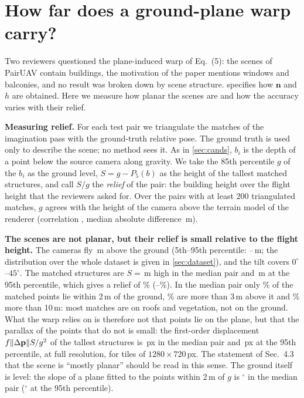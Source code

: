 \section{How far does a ground-plane warp carry?}
\label{sec:planarity}

Two reviewers questioned the plane-induced warp of Eq.~(5): the scenes of PairUAV contain buildings, the motivation of the paper mentions windows and balconies, and no result was broken down by scene structure.  specifies how $\mathbf{n}$ and $h$ are obtained. Here we measure how planar the scenes are and how the accuracy varies with their relief.

\noindent\textbf{Measuring relief.} For each test pair we triangulate the matches of the imagination pass with the ground-truth relative pose. The ground truth is used only to describe the scene; no method sees it. As in \cref{sec:cands}, $b_i$ is the depth of a point below the source camera along gravity. We take the 85th percentile $g$ of the $b_i$ as the ground level, $S=g-P_5(b)$ as the height of the tallest matched structures, and call $S/g$ the \emph{relief} of the pair: the building height over the flight height that the reviewers asked for. Over the \plN{} pairs with at least 200 triangulated matches, $g$ agrees with the height of the camera above the terrain model of the renderer (correlation \plTerrCorr, median absolute difference \plTerrDiff\,m).

\noindent\textbf{The scenes are not planar, but their relief is small relative to the flight height.} The cameras fly \plGroundMed\,m above the ground (5th--95th percentile: \plGroundLo--\plGroundHi\,m; the distribution over the whole dataset is given in \cref{sec:dataset}), and the tilt covers $0^\circ$--$45^\circ$. The matched structures are $S{=}$\plStructMed\,m high in the median pair and \plStructHi\,m at the 95th percentile, which gives a relief of \plReliefMed\% (\plReliefLo--\plReliefHi\%). In the median pair only \plNearMed\% of the matched points lie within 2\,m of the ground, \plOffThreeMed\% are more than 3\,m above it and \plOffTenMed\% more than 10\,m: most matches are on roofs and vegetation, not on the ground. What the warp relies on is therefore not that points lie on the plane, but that the parallax of the points that do not is small: the first-order displacement $f\|\Delta\mathbf{p}\|S/g^2$ of the tallest structures is \plParallaxMed\,px in the median pair and \plParallaxHi\,px at the 95th percentile, at full resolution, for tiles of $1280{\times}720$\,px. The statement of Sec.~4.3 that the scene is ``mostly planar'' should be read in this sense. The ground itself is level: the slope of a plane fitted to the points within 2\,m of $g$ is \plSlopeMed$^\circ$ in the median pair (\plSlopeHi$^\circ$ at the 95th percentile).

